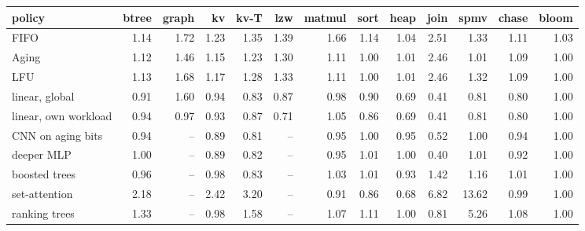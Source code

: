 \begin{tabular}{lrrrrrrrrrrrr}
\toprule
policy & btree & graph & kv & kv-T & lzw & matmul & sort & heap & join & spmv & chase & bloom \\
\midrule
FIFO & 1.14 & 1.72 & 1.23 & 1.35 & 1.39 & 1.66 & 1.14 & 1.04 & 2.51 & 1.33 & 1.11 & 1.03 \\
Aging & 1.12 & 1.46 & 1.15 & 1.23 & 1.30 & 1.11 & 1.00 & 1.01 & 2.46 & 1.01 & 1.09 & 1.00 \\
LFU & 1.13 & 1.68 & 1.17 & 1.28 & 1.33 & 1.11 & 1.00 & 1.01 & 2.46 & 1.32 & 1.09 & 1.00 \\
linear, global & 0.91 & 1.60 & 0.94 & 0.83 & 0.87 & 0.98 & 0.90 & 0.69 & 0.41 & 0.81 & 0.80 & 1.00 \\
linear, own workload & 0.94 & 0.97 & 0.93 & 0.87 & 0.71 & 1.05 & 0.86 & 0.69 & 0.41 & 0.81 & 0.80 & 1.00 \\
CNN on aging bits & 0.94 & -- & 0.89 & 0.81 & -- & 0.95 & 1.00 & 0.95 & 0.52 & 1.00 & 0.94 & 1.00 \\
deeper MLP & 1.00 & -- & 0.89 & 0.82 & -- & 0.95 & 1.01 & 1.00 & 0.40 & 1.01 & 0.92 & 1.00 \\
boosted trees & 0.96 & -- & 0.98 & 0.83 & -- & 1.03 & 1.01 & 0.93 & 1.42 & 1.16 & 1.01 & 1.00 \\
set-attention & 2.18 & -- & 2.42 & 3.20 & -- & 0.91 & 0.86 & 0.68 & 6.82 & 13.62 & 0.99 & 1.00 \\
ranking trees & 1.33 & -- & 0.98 & 1.58 & -- & 1.07 & 1.11 & 1.00 & 0.81 & 5.26 & 1.08 & 1.00 \\
\bottomrule
\end{tabular}

